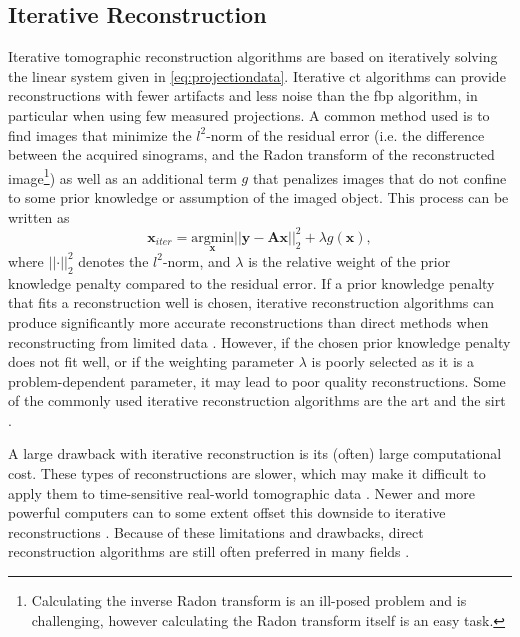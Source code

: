 \subsection{Iterative Reconstruction}
\label{sec:ct:reconstruction:iterative}
Iterative tomographic reconstruction algorithms are based on iteratively solving the linear system given in \cref{eq:projectiondata}. Iterative \gls{ct} algorithms can provide reconstructions with fewer artifacts and less noise than the \gls{fbp} algorithm, in particular when using few measured projections. A common method used is to find images that minimize the $l^2$-norm of the residual error (i.e. the difference between the acquired sinograms, and the Radon transform of the reconstructed image\footnote{Calculating the inverse Radon transform is an ill-posed problem and is challenging, however calculating the Radon transform itself is an easy task. }) as well as an additional term $g$ that penalizes images that do not confine to some prior knowledge or assumption of the imaged object. This process can be written as \cite{jimaging4110128}
\begin{equation}
    \label{eq:iterativesolution}
    \bm{x}_{iter} = \underset{\bm{x}}{\text{argmin}} \left|\left|\bm{y} - \bm{A}\bm{x}\right|\right|_2^2 + \lambda g(\bm{x}),
\end{equation}
where $\left|\left| \bm{\cdot} \right|\right|_2^2$ denotes the $l^2$-norm, and $\lambda$ is the relative weight of the prior knowledge penalty compared to the residual error. If a prior knowledge penalty that fits a reconstruction well is chosen, iterative reconstruction algorithms can produce significantly more accurate reconstructions than direct methods when reconstructing from limited data \cite{jimaging4110128}. However, if the chosen prior knowledge penalty does not fit well, or if the weighting parameter $\lambda$ is poorly selected as it is a problem-dependent parameter, it may lead to poor quality reconstructions. Some of the commonly used iterative reconstruction algorithms are the \gls{art} and the \gls{sirt} \cite[283-284]{KakSlaney98}. 

A large drawback with iterative reconstruction is its (often) large computational cost. These types of reconstructions are slower, which may make it difficult to apply them to time-sensitive real-world tomographic data \cite{jimaging4110128}. Newer and more powerful computers can to some extent offset this downside to iterative reconstructions \cite{willemink2013iterative}. Because of these limitations and drawbacks, direct reconstruction algorithms are still often preferred in many fields \cite{Pan_2009}. 

